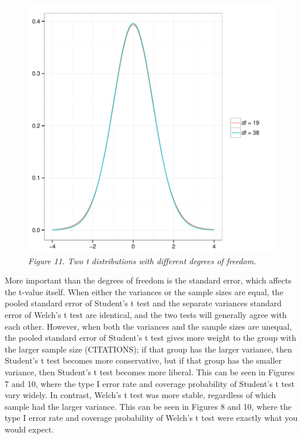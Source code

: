 \documentclass[man,a4paper,noextraspace,apacite]{apa6}
\begin{document}
\begin{figure}  
\includegraphics{WelchManuscript-MASTER-tdist}
\textit{Figure 11. Two t distributions with different degrees of freedom.}
\end{figure}
    
    More important than the degrees of freedom is the standard error, which affects the t-value itself. When either the variances or the sample sizes are equal, the pooled standard error of Student's t test and the separate variances standard error of Welch's t test are identical, and the two tests will generally agree with each other. However, when both the variances and the sample sizes are unequal, the pooled standard error of Student's t test gives more weight to the group with the larger sample size (CITATIONS); if that group has the larger variance, then Student's t test becomes more conservative, but if that group has the smaller variance, then Student's t test becomes more liberal. This can be seen in Figures 7 and 10, where the type I error rate and coverage probability of Student's t test vary widely. In contrast, Welch's t test was more stable, regardless of which sample had the larger variance. This can be seen in Figures 8 and 10, where the type I error rate and coverage probability of Welch's t test were exactly what you would expect.
    
\end{document}
